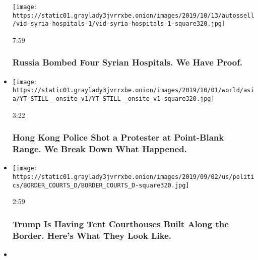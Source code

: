 \begin{itemize}
  \texttt{[image: https://static01.graylady3jvrrxbe.onion/images/2019/10/13/autossell/vid-syria-hospitals-1/vid-syria-hospitals-1-square320.jpg]}

  7:59

  \hypertarget{russia-bombed-four-syrian-hospitals-we-have-proof}{%
  \subsubsection{Russia Bombed Four Syrian Hospitals. We Have
  Proof.}\label{russia-bombed-four-syrian-hospitals-we-have-proof}}
\item
  \href{https://www.nytimes3xbfgragh.onion/video/world/asia/100000006745719/hong-kong-protester-shot.html?action=click\&module=video-series-bar\&region=header\&pgtype=Article\&playlistId=video/investigations}{}

  \texttt{[image: https://static01.graylady3jvrrxbe.onion/images/2019/10/01/world/asia/YT\_STILL\_\_onsite\_v1/YT\_STILL\_\_onsite\_v1-square320.jpg]}

  3:22

  \hypertarget{hong-kong-police-shot-a-protester-at-point-blank-range-we-break-down-what-happened}{%
  \subsubsection{Hong Kong Police Shot a Protester at Point-Blank Range.
  We Break Down What
  Happened.}\label{hong-kong-police-shot-a-protester-at-point-blank-range-we-break-down-what-happened}}
\item
  \href{https://www.nytimes3xbfgragh.onion/video/us/politics/100000006681200/border-immigration-tent-courthouses.html?action=click\&module=video-series-bar\&region=header\&pgtype=Article\&playlistId=video/investigations}{}

  \texttt{[image: https://static01.graylady3jvrrxbe.onion/images/2019/09/02/us/politics/BORDER\_COURTS\_D/BORDER\_COURTS\_D-square320.jpg]}

  2:59

  \hypertarget{trump-is-having-tent-courthouses-built-along-the-border-heres-what-they-look-like}{%
  \subsubsection{Trump Is Having Tent Courthouses Built Along the
  Border. Here's What They Look
  Like.}\label{trump-is-having-tent-courthouses-built-along-the-border-heres-what-they-look-like}}
\item
  \href{https://www.nytimes3xbfgragh.onion/video/world/asia/100000006649109/laser-pointers-and-traffic-cones-creative-ways-hong-kong-protesters-are-organizing.html?action=click\&module=video-series-bar\&region=header\&pgtype=Article\&playlistId=video/investigations}{}


\end{itemize}
